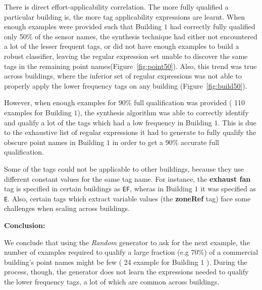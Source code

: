 There is direct effort-applicability correlation. The more fully qualified a particular building is, the more tag applicability expressions are learnt. When enough examples were provided such that Building $1$ had correctly fully qualified only 50\% of the sensor names, the synthesis technique had either not encountered a lot of the lesser frequent tags, or did not have enough examples to build a robust classifier, leaving the regular expression set unable to discover the same tags in the remaining point names(Figure~\ref{fig:point50}). Also, this trend was true across buildings, where the inferior set of regular expressions was not able to properly apply the lower frequency tags on any building (Figure~\ref{fig:build50}).

However, when enough examples for 90\% full qualification was provided ( 110 examples for Building $1$), the synthesis algorithm was able to correctly identify and qualify a lot of the tags which had a low frequency in Building $1$. This is due to the exhaustive list of regular expressions it had to generate to fully qualify the obscure point names in Building $1$ in order to get a 90\% accurate full qualification. 


Some of the tags could not be applicable to other buildings, because they use different constant values for the same tag name. For instance, the {\bf exhaust fan} tag is specified in certain buildings as \texttt{EF}, wheras in Building $1$ it was specified as \texttt{E}. Also, certain tags which extract variable values (the {\bf zoneRef} tag) face some challenges when scaling across buildings. 

{\bf Conclusion:}

We conclude that using the {\it Random} generator to ask for the next example, the number of examples required to qualify a large fraction (e.g 70\%) of a commercial building's point names might be few ( 24 example for Building $1$ ). During the process, though, the generator does not learn the expressions needed to qualify the lower frequency tags, a lot of which are common across buildings. 

